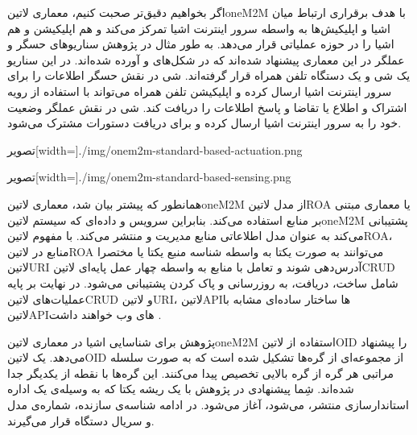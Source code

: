 اگر بخواهیم دقیق‌تر صحبت کنیم، معماری ‌لاتین{oneM2M} با هدف برقراری ارتباط میان اشیا و اپلیکیش‌ها به واسطه سرور اینترنت اشیا تمرکز می‌کند و هم اپلیکیشن و هم
اشیا را در حوزه عملیاتی قرار می‌دهد. به طور مثال در پژوهش  سناریوهای حسگر و عملگر در این معماری پیشنهاد شده‌اند که در شکل‌های
 و 
آورده شده‌اند. در این سناریو یک شی و یک دستگاه تلفن همراه قرار گرفته‌اند. شی در نقش حسگر اطلاعات را برای سرور اینترنت اشیا ارسال کرده و اپلیکیشن تلفن همراه می‌تواند
با استفاده از رویه اشتراک و اطلاع یا تقاضا و پاسخ اطلاعات را دریافت کند. شی در نقش عملگر وضعیت خود را به سرور اینترنت اشیا ارسال کرده و برای دریافت دستورات مشترک
می‌شود.

‌تصویر[width=\textwidth]{./img/onem2m-standard-based-actuation.png}

‌تصویر[width=\textwidth]{./img/onem2m-standard-based-sensing.png}

همانطور که پیشتر بیان شد، معماری ‌لاتین{oneM2M} از مدل ‌لاتین{ROA} یا معماری مبتنی بر منابع استفاده می‌کند.
بنابراین سرویس و داده‌ای که سیستم ‌لاتین{oneM2M} پشتیبانی می‌کند به عنوان مدل اطلاعاتی منابع مدیریت و منتشر می‌کند.
با مفهوم ‌لاتین{ROA}، منابع در ‌لاتین{ROA} می‌توانند به صورت یکتا به واسطه شناسه منبع یکتا یا مختصرا ‌لاتین{URI}
آدرس‌دهی شوند و تعامل با منابع به واسطه چهار عمل پایه‌ای ‌لاتین{CRUD} شامل ساخت، دریافت، به روزرسانی و پاک کردن پشتیبانی می‌شود.
در نهایت بر پایه عملیات‌های ‌لاتین{CRUD} و ‌لاتین{URI}، ‌لاتین{API}ها ساختار ساده‌ای مشابه با ‌لاتین{API}های وب خواهند داشت
.

پژوهش  برای شناسایی اشیا در معماری ‌لاتین{oneM2M} استفاده از ‌لاتین{OID} را پیشنهاد می‌دهد.
یک ‌لاتین{OID} از مجموعه‌ای از گره‌ها تشکیل شده است که به صورت سلسله مراتبی هر گره از گره بالایی تخصیص پیدا می‌کنند.
این گره‌ها با نقطه از یکدیگر جدا شده‌اند. شِما پیشنهادی در پژوهش  با یک ریشه یکتا که به وسیله‌ی یک اداره استاندارسازی منتشر،
می‌شود، آغاز می‌شود. در ادامه شناسه‌ی سازنده، شماره‌ی مدل و سریال دستگاه قرار می‌گیرند.

